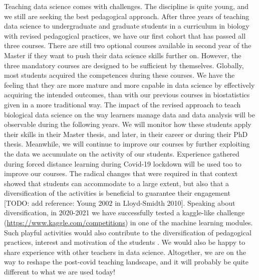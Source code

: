 \documentclass{aims}
\theoremstyle{definition}
\begin{document}
Teaching data science comes with challenges. The discipline is quite
young, and we still are seeking the best pedagogical approach. After
three years of teaching data science to undergraduate and graduate
students in a curriculum in biology with revised pedagogical practices,
we have our first cohort that has passed all three courses. There are
still two optional courses available in second year of the Master if
they want to push their data science skills further on. However, the
three mandatory courses are designed to be sufficient by themselves.
Globally, most students acquired the competences during these courses.
We have the feeling that they are more mature and more capable in data
science by effectively acquiring the intended outcomes, than with our
previous courses in biostatistics given in a more traditional way. The
impact of the revised approach to teach biological data science on the
way learners manage data and data analysis will be observable during the
following years. We will monitor how these students apply their skills
in their Master thesis, and later, in their career or during their PhD
thesis. Meanwhile, we will continue to improve our courses by further
exploiting the data we accumulate on the activity of our students.
Experience gathered during forced distance learning during Covid-19
lockdown will be used too to improve our courses. The radical changes
that were required in that context showed that students can accommodate
to a large extent, but also that a diversification of the activities is
beneficial to guarantee their engagement \cite{Spadafora2018} {[}TODO:
add reference: Young 2002 in Lloyd-Smidth 2010{]}. Speaking about
diversification, in 2020-2021 we have successfully tested a kaggle-like
challenge (\url{https://www.kaggle.com/competitions}) in one of the
machine learning modules. Such playful activities would also contribute
to the diversification of pedagogical practices, interest and motivation
of the students \cite{Alonso2019}. We would also be happy to share
experience with other teachers in data science. Altogether, we are on
the way to reshape the post-covid teaching landscape, and it will
probably be quite different to what we are used today!

\end{document}
